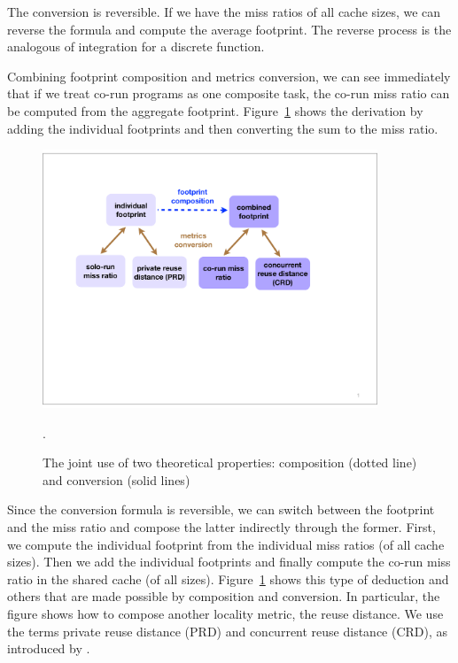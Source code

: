 The conversion is reversible.  If we have the miss ratios of all cache
sizes, we can reverse the formula and compute the average
footprint.  The reverse process is the analogous of integration for
a discrete function.  


Combining footprint composition and metrics conversion, we can see immediately that if 
we treat co-run programs as one composite task, the
co-run miss ratio can be computed from the aggregate footprint.
Figure~\ref{fig:conversion} shows the derivation by adding
the individual footprints and then converting the sum to the miss ratio.  

\begin{figure}[h]
\centering
\includegraphics[width=10cm]{figures/intro/conversion}
\caption{The joint use of two theoretical properties: composition (dotted line) and conversion (solid lines)}.
\label{fig:conversion}
\end{figure}

Since the conversion formula is reversible, we can switch 
between the footprint and the miss ratio and compose the latter indirectly through the former.  
First, we compute the individual
footprint from the individual miss ratios (of all cache sizes).  Then 
we 
add the individual footprints and finally compute the co-run miss
ratio in the shared cache (of all sizes).  Figure~\ref{fig:conversion}
shows this type of deduction and others that are made possible by
composition and conversion.  In particular, the figure shows how to compose another locality
metric, the reuse distance.  We use the terms private reuse distance (PRD)
and concurrent reuse distance (CRD), as introduced by \cite{WuY:PACT11,Wu+:ISCA13}.

